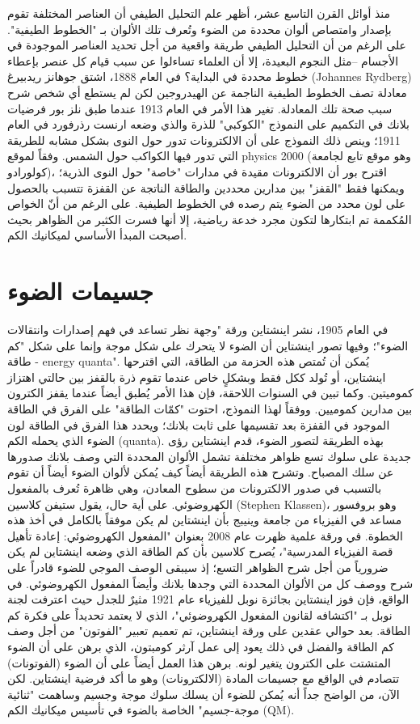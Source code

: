منذ أوائل القرن التاسع عشر، أظهر علم التحليل الطيفي أن العناصر المختلفة تقوم بإصدار وامتصاص ألوان محددة من الضوء وتُعرف تلك الألوان بـ "الخطوط الطيفية". على الرغم من أن التحليل الطيفي طريقة واقعية من أجل تحديد العناصر الموجودة في الأجسام –مثل النجوم البعيدة، إلا أن العلماء تساءلوا عن سبب قيام كل عنصر بإعطاء خطوط محددة في البداية؟ في العام 1888، اشتق جوهانز ريدبيرغ (Johannes Rydberg) معادلة تصف الخطوط الطيفية الناجمة عن الهيدروجين لكن لم يستطع أي شخص شرح سبب صحة تلك المعادلة. تغير هذا الأمر في العام 1913 عندما طبق نلز بور فرضيات بلانك في التكميم على النموذج "الكوكبي" للذرة والذي وضعه ارنست رذرفورد في العام 1911؛ وينص ذلك النموذج على أن الالكترونات تدور حول النوى بشكل مشابه للطريقة التي تدور فيها الكواكب حول الشمس. وفقاً لموقع physics 2000 (وهو موقع تابع لجامعة كولورادو)، اقترح بور أن الالكترونات مقيدة في مدارات "خاصة" حول النوى الذرية؛ ويمكنها فقط "القفز" بين مدارين محددين والطاقة الناتجة عن القفزة تتسبب بالحصول على لون محدد من الضوء يتم رصده في الخطوط الطيفية. على الرغم من أنّ الخواص المُكممة تم ابتكارها لتكون مجرد خدعة رياضية، إلا أنها فسرت الكثير من الظواهر بحيث أصبحت المبدأ الأساسي لميكانيك الكم. 

\section*{جسيمات الضوء}

في العام 1905، نشر اينشتاين ورقة "وجهة نظر تساعد في فهم إصدارات وانتقالات الضوء"؛ وفيها تصور اينشتاين أن الضوء لا يتحرك على شكل موجة وإنما على شكل "كم طاقة - energy quanta". يُمكن أن تُمتص هذه الحزمة من الطاقة، التي اقترحها اينشتاين، أو تُولد ككل فقط وبشكلٍ خاص عندما تقوم ذرة بالقفز بين حالتي اهتزاز كموميتين. وكما تبين في السنوات اللاحقة، فإن هذا الأمر يُطبق أيضاً عندما يقفز الكترون بين مدارين كموميين. ووفقاً لهذا النموذج، احتوت "كمّات الطاقة" على الفرق في الطاقة الموجود في القفزة بعد تقسيمها على ثابت بلانك؛ ويحدد هذا الفرق في الطاقة لون الضوء الذي يحمله الكم (quanta). بهذه الطريقة لتصور الضوء، قدم اينشتاين رؤى جديدة على سلوك تسع ظواهر مختلفة تشمل الألوان المحددة التي وصف بلانك صدورها عن سلك المصباح. وتشرح هذه الطريقة أيضاً كيف يُمكن لألوان الضوء أيضاً أن تقوم بالتسبب في صدور الالكترونات من سطوح المعادن، وهي ظاهرة تُعرف بالمفعول الكهروضوئي. على أية حال، يقول ستيفن كلاسين (Stephen Klassen)، وهو بروفسور مساعد في الفيزياء من جامعة وينيبج بأن اينشتاين لم يكن موفقاً بالكامل في أخذ هذه الخطوة. في ورقة علمية ظهرت عام 2008 بعنوان "المفعول الكهروضوئي: إعادة تأهيل قصة الفيزياء المدرسية"، يُصرح كلاسين بأن كم الطاقة الذي وضعه اينشتاين لم يكن ضرورياً من أجل شرح الظواهر التسع؛ إذ سيبقى الوصف الموجي للضوء قادراً على شرح ووصف كل من الألوان المحددة التي وجدها بلانك وأيضاً المفعول الكهروضوئي. في الواقع، فإن فوز اينشتاين بجائزة نوبل للفيزياء عام 1921 مثيرٌ للجدل حيث اعترفت لجنة نوبل بـ "اكتشافه لقانون المفعول الكهروضوئي"، الذي لا يعتمد تحديداً على فكرة كم الطاقة. بعد حوالي عقدين على ورقة اينشتاين، تم تعميم تعبير "الفوتون" من أجل وصف كم الطاقة والفضل في ذلك يعود إلى عمل آرثر كومبتون، الذي برهن على أن الضوء المتشتت على الكترون يتغير لونه. برهن هذا العمل أيضاً على أن الضوء (الفوتونات) تتصادم في الواقع مع جسيمات المادة (الالكترونات) وهو ما أكد فرضية اينشتاين. لكن الآن، من الواضح جداً أنه يُمكن للضوء أن يسلك سلوك موجة وجسيم وساهمت "ثنائية موجة-جسيم" الخاصة بالضوء في تأسيس ميكانيك الكم (QM).


